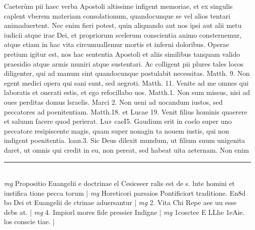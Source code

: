 \documentclass{article}
\begin{document}
\begin{pages}
\pend\pstart Caeterùm pii haec verba Apostoli altissime infigent memoriae, et ex singulis caplent vberem materiam consolationum, quandocunque se vel alios tentari animaduertent. Nec enim fieri potest, quin aliquando aut nos ipsi aut alii metu iudicii atque irae Dei, et propriorum scelerum conscientia animo consternemur, atque etiam in hac vita circumuallemur mortis et inferni doloribus. Operae pretium igitur est, nos hac sententia Apostoli et aliis similibus tanquam valido praesidio atque armis muniri atque sustentari. Ac colligent pii plures tales locos diligenter, qui ad manum sint quandocunque postulabit necessitas. Matth. 9. Non egent medici opera qui sani sunt, sed aegroti. Matth. 11. Venite ad me omnes qui laboratis et onerati estis, et ego refocillabo uos. Matth.1. Non sum missus, nisi ad oues perditas domus lsraelis. Marci 2. Non ueni ad uocandum iustos, sed peccatores ad poenitentiam. Matth.18. et Lucae 19. Venit filius hominis quaerere et saluum facere quod perierat. Lu» caeI5. Gaudium erit in coelo super uno peccatore resipiscente magis, quam super nonagin   ta nouem iustis, qui non indigent poenitentia. loan.3. Sic Deus dilexit mundum, ut filium suum   unigenita daret, ut omnis qui credit in eu, non pereat, sed habeat uita aeternam. Non enim  \pend
\vspace{0.5cm}\noindent
\vspace{0.2cm}\rule{1cm}{0.2pt}\\ 
\hspace{0.2cm}\textit{mg}
\footnotesize Propositio Euangelii e doctrinae el Cesicseer ralis est de s. lute homini et iustifica tione pecca torum 
\normalsize| 
\hspace{0.2cm}\textit{mg}
\footnotesize Horeticori parsaios Pontificiort traditione. En8d bo Dei et Euangelii de ctrinae aduersantur 
\normalsize| 
\hspace{0.2cm}\textit{mg}
\footnotesize 2. Vita Chi Repe aee uu esse debs at. 
\normalsize| 
\hspace{0.2cm}\textit{mg}
\footnotesize 4. Impiorl mores fide pressier Indigne 
\normalsize| 
\hspace{0.2cm}\textit{mg}
\footnotesize 1cosctee E LLhe 1eAie. los conscie tiae. 
\normalsize| 

\end{pages}
\end{document}
